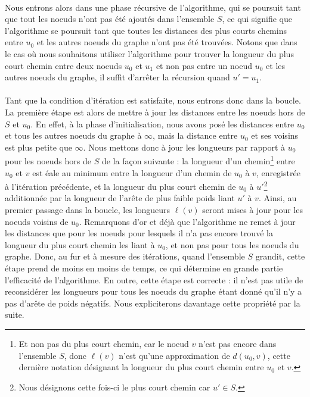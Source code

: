 \paragraph{}

Nous entrons alors dans une phase récursive de l'algorithme, qui se poursuit tant que tout les noeuds n'ont pas été ajoutés dans l'ensemble $S$, ce qui signifie que l'algorithme se poursuit tant que toutes les distances des plus courts chemins entre $u_0$ et les autres noeuds du graphe n'ont pas été trouvées.
Notons que dans le cas où nous souhaitons utiliser l'algorithme pour trouver la longueur du plus court chemin entre deux noeuds $u_0$ et $u_1$ et non pas entre un noeud $u_0$ et les autres noeuds du graphe, il suffit d'arrêter la récursion quand $u'=u_1$.

\paragraph{}

Tant que la condition d'itération est satisfaite, nous entrons donc dans la boucle.
La première étape est alors de mettre à jour les distances entre les noeuds hors de $S$ et $u_0$.
En effet, à la phase d'initialisation, nous avons posé les distances entre $u_0$ et tous les autres noeuds du graphe à $\infty$, mais la distance entre $u_0$ et ses voisins est plus petite que $\infty$.
Nous mettons donc à jour les longueurs par rapport à $u_0$ pour les noeuds hors de $S$ de la façon suivante : la longueur d'un chemin\footnote{Et non pas du plus court chemin, car le noeud $v$ n'est pas encore dans l'ensemble $S$, donc $\ell(v)$ n'est qu'une approximation de $d(u_0,v)$, cette dernière notation désignant la longueur du plus court chemin entre $u_0$ et $v$.} entre $u_0$ et $v$ est éale au minimum entre la longueur d'un chemin de $u_0$ à $v$, enregistrée à l'itération précédente, et la longueur du plus court chemin de $u_0$ à $u'$\footnote{Nous désignons cette fois-ci le plus court chemin car $u' \in S$.} additionnée par la longueur de l'arête de plus faible poids liant $u'$ à $v$.
Ainsi, au premier passage dans la boucle, les longueurs $\ell(v)$ seront mises à jour pour les noeuds voisins de $u_0$.
Remarquons d'or et déjà que l'algorithme ne remet à jour les distances que pour les noeuds pour lesquels il n'a pas encore trouvé la longueur du plus court chemin les liant à $u_0$, et non pas pour tous les noeuds du graphe.
Donc, au fur et à mesure des itérations, quand l'ensemble $S$ grandit, cette étape prend de moins en moins de temps, ce qui détermine en grande partie l'efficacité de l'algorithme.
En outre, cette étape est correcte : il n'est pas utile de reconsidérer les longueurs pour tous les noeuds du graphe étant donné qu'il n'y a pas d'arête de poids négatifs.
Nous expliciterons davantage cette propriété par la suite.

